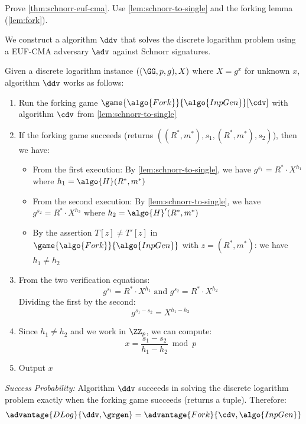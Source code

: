 \begin{exercise}\label{ex:schnorr-euf-cma}
  Prove \autoref{thm:schnorr-euf-cma}. Use \autoref{lem:schnorr-to-single} and the forking lemma (\autoref{lem:fork}).
\end{exercise}

\ifsolutions
\begin{mysolution}
  We construct a \ppt algorithm $\ddv$ that solves the discrete logarithm problem using a \ppt EUF-CMA adversary $\adv$ against Schnorr signatures.
  
  Given a discrete logarithm instance $((\GG, p, g), X)$ where $X = g^x$ for unknown $x$, algorithm $\ddv$ works as follows:
  \begin{enumerate}
    \item Run the forking game $\game{\algo{Fork}}{\algo{InpGen}}[\cdv]$ with algorithm $\cdv$ from \autoref{lem:schnorr-to-single}
    \item If the forking game succeeds (returns $((R^*, m^*), s_1, (R^*, m^*), s_2)$), then we have:
    \begin{itemize}
      \item From the first execution: By \autoref{lem:schnorr-to-single}, we have $g^{s_1} = R^* \cdot X^{h_1}$ where $h_1 = \algo{H}(R^*, m^*)$
      \item From the second execution: By \autoref{lem:schnorr-to-single}, we have $g^{s_2} = R^* \cdot X^{h_2}$ where $h_2 = \algo{H}'(R^*, m^*)$
      \item By the assertion $T[z] \neq T'[z]$ in $\game{\algo{Fork}}{\algo{InpGen}}$ with $z = (R^*, m^*)$: we have $h_1 \neq h_2$
    \end{itemize}
    \item From the two verification equations:
    \[
      g^{s_1} = R^* \cdot X^{h_1} \text{ and } g^{s_2} = R^* \cdot X^{h_2}
    \]
    Dividing the first by the second:
    \[
      g^{s_1 - s_2} = X^{h_1 - h_2}
    \]
    \item Since $h_1 \neq h_2$ and we work in $\ZZ_p$, we can compute:
    \[
      x = \frac{s_1 - s_2}{h_1 - h_2} \bmod p
    \]
    \item Output $x$
  \end{enumerate}
  
  \emph{Success Probability:} Algorithm $\ddv$ succeeds in solving the discrete logarithm problem exactly when the forking game succeeds (returns a tuple). Therefore:
  \[
    \advantage{DLog}{\ddv, \grgen} = \advantage{Fork}{\cdv, \algo{InpGen}}
  \]
  

\end{mysolution}
